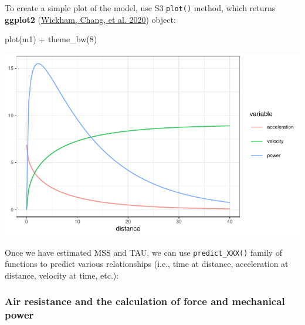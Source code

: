 \documentclass[fleqn,10pt,lineno]{wlpeerj} %
\newenvironment{Shaded}{\begin{snugshade}}{\end{snugshade}}
\newcommand{\AttributeTok}[1]{\textcolor[rgb]{0.77,0.63,0.00}{#1}}
\newcommand{\CommentTok}[1]{\textcolor[rgb]{0.56,0.35,0.01}{\textit{#1}}}
\newcommand{\DecValTok}[1]{\textcolor[rgb]{0.00,0.00,0.81}{#1}}
\newcommand{\FunctionTok}[1]{\textcolor[rgb]{0.00,0.00,0.00}{#1}}
\newcommand{\NormalTok}[1]{#1}
\newcommand{\SpecialCharTok}[1]{\textcolor[rgb]{0.00,0.00,0.00}{#1}}
\begin{document}
To create a simple plot of the model, use S3 \texttt{plot()} method, which returns \textbf{ggplot2} (\protect\hyperlink{ref-R-ggplot2}{Wickham, Chang, et al. 2020}) object:

\begin{Shaded}
\begin{Highlighting}[]
\FunctionTok{plot}\NormalTok{(m1) }\SpecialCharTok{+} \FunctionTok{theme\_bw}\NormalTok{(}\DecValTok{8}\NormalTok{)}
\end{Highlighting}
\end{Shaded}

\begin{center}\includegraphics[width=0.9\linewidth]{paper_files/figure-latex/unnamed-chunk-2-1} \end{center}

Once we have estimated MSS and TAU, we can use \texttt{predict\_XXX()} family of functions to predict various relationships (i.e., time at distance, acceleration at distance, velocity at time, etc.):

\begin{Shaded}
\end{Shaded}

\hypertarget{air-resistance-and-the-calculation-of-force-and-mechanical-power}{%
\subsubsection{Air resistance and the calculation of force and mechanical power}\label{air-resistance-and-the-calculation-of-force-and-mechanical-power}}
\end{document}
